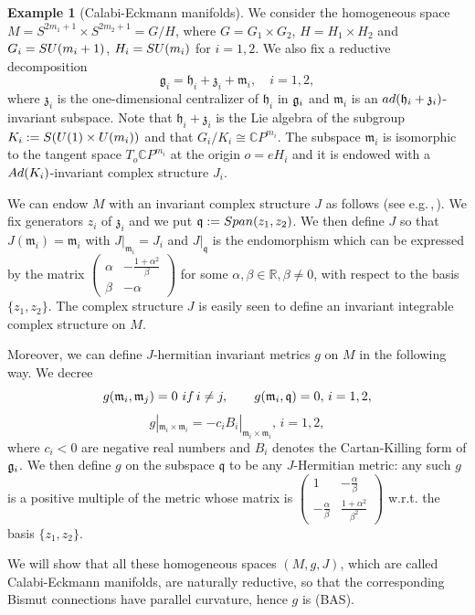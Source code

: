 \documentclass{amsart}
\numberwithin{equation}{section}
\theoremstyle{definition}
\newtheorem{example}  [theorem]     {Example}
\renewcommand{\1}{\mathds{1}}
\newcommand{\gq}{\mathfrak q}
\newcommand{\gz}{\mathfrak z}
\newcommand{\gh}{\mathfrak h}
\newcommand{\gm}{\mathfrak m}
\newcommand{\SU}{\rm {SU}}
\renewcommand{\>}{\rightarrow}
\begin{document}
\begin{example}[Calabi-Eckmann manifolds] We consider the homogeneous space $M=S^{2m_1+1}\times S^{2m_2+1}= G/H$, where $G = G_1\times G_2$, $H = H_1\times H_2$ and
$G_i = \SU(m_i+1)$, $H_i= \SU(m_i)$ for $i=1,2$. We also fix a reductive decomposition
$$\mathfrak g_i = \gh_i + \gz_i +\gm_i,\quad i=1,2, $$
where $\gz_i$ is the one-dimensional centralizer of $\gh_i$ in $\frak g_i$ and $\gm_i$ is an $\rm{ad}(\gh_i+\gz_i)$-invariant subspace. Note that $\gh_i+\gz_i$ is the Lie algebra of the subgroup $K_i:= \rm{S}(\rm U(1)\times \rm U(m_i))$ and that $G_i/K_i \cong \mathbb CP^{m_i}$. The subspace $\gm_i$ is isomorphic to the tangent space $T_o\mathbb CP^{m_i}$ at the origin $o=eH_i$ and it is endowed with a ${\rm Ad}(K_i)$-invariant complex structure $J_i$.

We can endow $M$ with an invariant complex structure $J$ as follows (see e.g.\,\cite{Tsukada},\,\cite{B12}). We fix generators $z_i$ of $\gz_i$ and we put $\gq:= {\rm{Span}}(z_1,z_2)$. We then define $J$ so that $J(\gm_i)=\gm_i$ with $J|_{\gm_i}=J_i$ and $J|_{\gq}$ is the endomorphism which can be expressed  by the matrix $\left(\begin{smallmatrix} \alpha & -\frac{1+\alpha^2}\beta \\ \beta& -\alpha\end{smallmatrix}\right)$ for some $\alpha,\beta\in \mathbb R,\beta\neq 0$, with respect to the basis $\{z_1,z_2\}$. The complex structure $J$ is easily seen to define an invariant integrable complex structure on $M$.

Moreover, we can define $J$-hermitian invariant metrics $g$ on $M$ in the following way. We decree
$$g(\gm_i,\gm_j)=0\ {\rm{if}}\, i\neq j,\qquad g(\gm_i,\gq)=0,\, i=1,2,$$
$$g|_{\gm_i\times \gm_i} = -c_iB_i|_{\gm_i\times \gm_i},\, i=1,2,$$
where $c_i<0$ are negative real numbers and $B_i$ denotes the Cartan-Killing form of $\frak g_i$. We then define $g$ on the subspace $\gq$ to be any $J$-Hermitian metric: any such $g$ is a positive multiple of the metric whose matrix is $\left(\begin{smallmatrix} 1 & -\frac\alpha \beta \\ -\frac\alpha\beta& \frac{1+\alpha^2}{\beta^2}\end{smallmatrix}\right)$ w.r.t. the basis $\{z_1,z_2\}$.

We will show that all these homogeneous spaces $(M,g,J)$, which are called Calabi-Eckmann manifolds, are naturally reductive, so that the corresponding Bismut connections have parallel curvature, hence $g$ is ({\rm BAS}).


\end{example}
\end{document}
